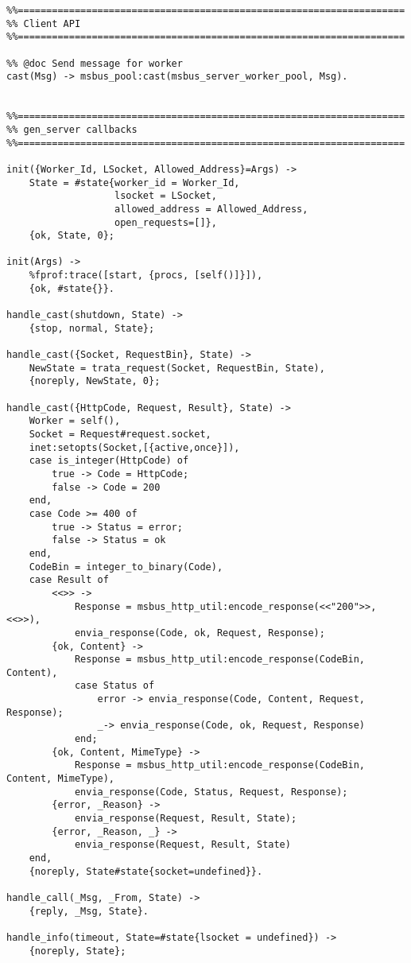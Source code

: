 \begin{lstlisting}
%%====================================================================
%% Client API
%%====================================================================

%% @doc Send message for worker
cast(Msg) -> msbus_pool:cast(msbus_server_worker_pool, Msg).


%%====================================================================
%% gen_server callbacks
%%====================================================================

init({Worker_Id, LSocket, Allowed_Address}=Args) ->
    State = #state{worker_id = Worker_Id, 
				   lsocket = LSocket, 
				   allowed_address = Allowed_Address,
				   open_requests=[]},
    {ok, State, 0};

init(Args) ->
    %fprof:trace([start, {procs, [self()]}]),
    {ok, #state{}}.

handle_cast(shutdown, State) ->
    {stop, normal, State};

handle_cast({Socket, RequestBin}, State) ->
	NewState = trata_request(Socket, RequestBin, State),
	{noreply, NewState, 0};
	
handle_cast({HttpCode, Request, Result}, State) ->
	Worker = self(),
	Socket = Request#request.socket,
	inet:setopts(Socket,[{active,once}]),
	case is_integer(HttpCode) of
		true -> Code = HttpCode;
		false -> Code = 200
	end,
	case Code >= 400 of
		true -> Status = error;
		false -> Status = ok
	end,
	CodeBin = integer_to_binary(Code), 
	case Result of
		<<>> -> 
			Response = msbus_http_util:encode_response(<<"200">>, <<>>),
			envia_response(Code, ok, Request, Response);
		{ok, Content} -> 
			Response = msbus_http_util:encode_response(CodeBin, Content),
			case Status of
				error -> envia_response(Code, Content, Request, Response);
				_-> envia_response(Code, ok, Request, Response)
			end;
		{ok, Content, MimeType} -> 
			Response = msbus_http_util:encode_response(CodeBin, Content, MimeType),
			envia_response(Code, Status, Request, Response);
		{error, _Reason} -> 
			envia_response(Request, Result, State);
		{error, _Reason, _} -> 
			envia_response(Request, Result, State)
	end,
	{noreply, State#state{socket=undefined}}.

handle_call(_Msg, _From, State) ->
	{reply, _Msg, State}.

handle_info(timeout, State=#state{lsocket = undefined}) ->
	{noreply, State};


\end{lstlisting}
